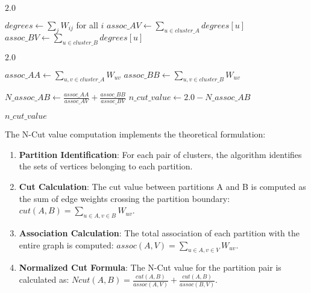 \documentclass[12pt,a4paper]{article}
\begin{document}
{\begin{algorithm}[H]
\begin{algorithmic}[1]
            \State \Return $2.0$ 
        \EndIf
        
        \State $degrees \gets \sum_{j} W_{ij}$ for all $i$ 
        \State $assoc\_AV \gets \sum_{u \in cluster\_A} degrees[u]$ 
        \State $assoc\_BV \gets \sum_{u \in cluster\_B} degrees[u]$ 
        
            \State \Return $2.0$ 
        \EndIf
        
        \State $assoc\_AA \gets \sum_{u,v \in cluster\_A} W_{uv}$ 
        \State $assoc\_BB \gets \sum_{u,v \in cluster\_B} W_{uv}$ 
        
        \State $N\_assoc\_AB \gets \frac{assoc\_AA}{assoc\_AV} + \frac{assoc\_BB}{assoc\_BV}$
        \State $n\_cut\_value \gets 2.0 - N\_assoc\_AB$
        
        \State \Return $n\_cut\_value$
    \EndFunction
\end{algorithmic}
\end{algorithm}

The N-Cut value computation implements the theoretical formulation:

\begin{enumerate}
    \item \textbf{Partition Identification}: For each pair of clusters, the algorithm identifies the sets of vertices belonging to each partition.
    
    \item \textbf{Cut Calculation}: The cut value between partitions A and B is computed as the sum of edge weights crossing the partition boundary: $cut(A,B) = \sum_{u \in A, v \in B} W_{uv}$.
    
    \item \textbf{Association Calculation}: The total association of each partition with the entire graph is computed: $assoc(A,V) = \sum_{u \in A, v \in V} W_{uv}$.
    
    \item \textbf{Normalized Cut Formula}: The N-Cut value for the partition pair is calculated as: $Ncut(A,B) = \frac{cut(A,B)}{assoc(A,V)} + \frac{cut(A,B)}{assoc(B,V)}$.
    

\end{enumerate}}
\end{document}
